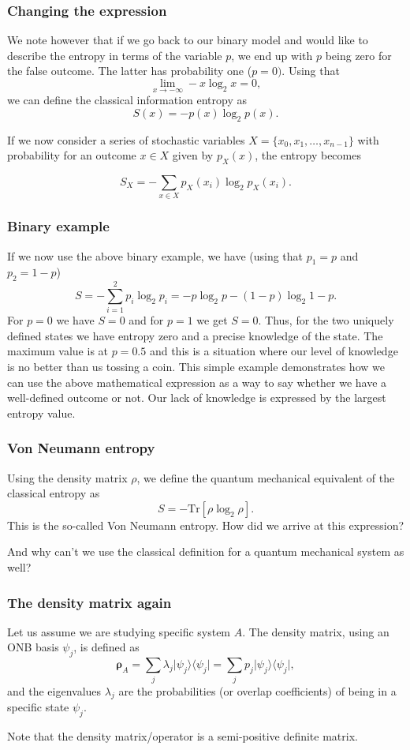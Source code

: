 \documentclass{beamer}
\begin{document}
\begin{frame}
\frametitle{Changing the expression}

We note however that if we go back to our binary model and would like to
describe the entropy in terms of the variable $p$, we end up with $p$ being zero for the false outcome.
The latter has probability one ($p=0)$.
Using that
\[
\lim_{x\to -\infty} -x \log_2{x}=0,
\]
we can define the classical information entropy as
\[
S(x) = -p(x) \log_2{p(x)}.
\]

If we now consider a series of stochastic variables
$X=\{x_0,x_1,\dots,x_{n-1}\}$ with probability for an outcome $x\in X$
given by $p_X(x)$, the entropy becomes

\[
S_X = -\sum_{x\in X}p_X(x_i) \log_2{p_X(x_i)}.
\]
\end{frame}

\begin{frame}
\frametitle{Binary example}

If we now use the above binary example, we have (using that $p_1=p$ and $p_2=1-p$)
\[
S = -\sum_{i=1}^{2}p_i \log_2{p_i}=-p\log_2{p}-(1-p)\log_2{1-p}.
\]
For $p=0$ we have $S=0$ and for $p=1$ we get $S=0$. Thus, for the two
uniquely defined states we have entropy zero and a precise knowledge of the state. The maximum value is at
$p=0.5$ and this is a situation where our level of knowledge is no
better than us tossing a coin. This simple example demonstrates how we
can use the above mathematical expression as a way to say whether we
have a well-defined outcome or not. Our lack of knowledge is expressed
by the largest entropy value.
\end{frame}

\begin{frame}
\frametitle{Von Neumann entropy}

Using the density matrix $\rho$, we define the quantum mechanical equivalent of the classical entropy as 
\[
S=-\mathrm{Tr}[\rho\log_2{\rho}].
\]
This is the so-called Von Neumann entropy. How did we arrive at this expression? 

And why can't we use the classical definition for a quantum mechanical system as well?
\end{frame}

\begin{frame}
\frametitle{The density matrix again}

Let us assume we are studying specific system $A$. The density matrix,
using an ONB basis $\psi_j$, is defined as
\[
\bm{\rho}_A=\sum_j\lambda_j\vert \psi_j\rangle\langle \psi_j\vert=\sum_j p_j\vert \psi_j\rangle\langle \psi_j\vert,
\]
and the eigenvalues $\lambda_j$ are the probabilities (or overlap coefficients) of being in a
specific state $\psi_j$. 

Note that the density matrix/operator is a semi-positive definite matrix.
\end{frame}
\end{document}
